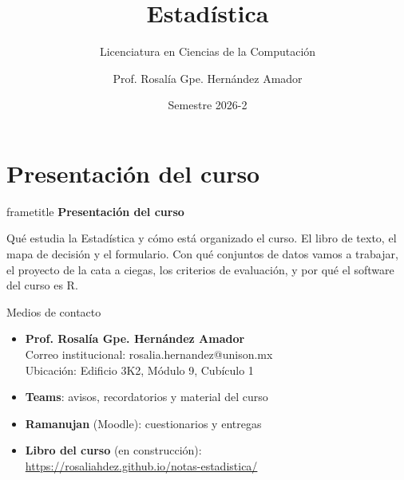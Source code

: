 \documentclass[aspectratio=169,10pt]{beamer}
\title{\LARGE\textbf{Estadística}}
\subtitle{Licenciatura en Ciencias de la Computación}
\author{Prof. Rosalía Gpe. Hernández Amador}
\institute{Departamento de Matemáticas · Universidad de Sonora}
\date{Semestre 2026-2}
\newcommand{\hojaSesion}[2]{%
  \vfill
  \begin{beamercolorbox}[wd=\textwidth,sep=16pt,center]{frametitle}
    {\Large\bfseries #1}\\[11pt]
    \begin{minipage}{0.82\textwidth}\centering\small #2\end{minipage}
  \end{beamercolorbox}
  \vfill}
\begin{document}
\begin{frame}[plain]
  \titlepage
\end{frame}
\section{Presentación del curso}
\begin{frame}[plain]
  \hojaSesion{Presentación del curso}{%
  Qué estudia la Estadística y cómo está organizado el curso. El libro de texto, el mapa de decisión y el formulario. Con qué conjuntos de datos vamos a trabajar, el
  proyecto de la cata a ciegas, los criterios de evaluación, y por qué el
  software del curso es R.}
\end{frame}
\begin{frame}{Medios de contacto}
\begin{itemize}
    \item \textbf{Prof. Rosalía Gpe. Hernández Amador}\\
      {\small Correo institucional: rosalia.hernandez@unison.mx}\\
      {\small Ubicación: Edificio 3K2, Módulo 9, Cubículo 1}
      \vspace{0.25cm}
    \item \textbf{Teams}: avisos, recordatorios y material del curso
      \vspace{0.25cm}
    \item \textbf{Ramanujan} (Moodle): cuestionarios y entregas
      \vspace{0.25cm}
    \item \textbf{Libro del curso} (en construcción):\\
      {\small \url{https://rosaliahdez.github.io/notas-estadistica/}}
\end{itemize}
      \vspace{0.2cm}
\end{frame}
\end{document}
